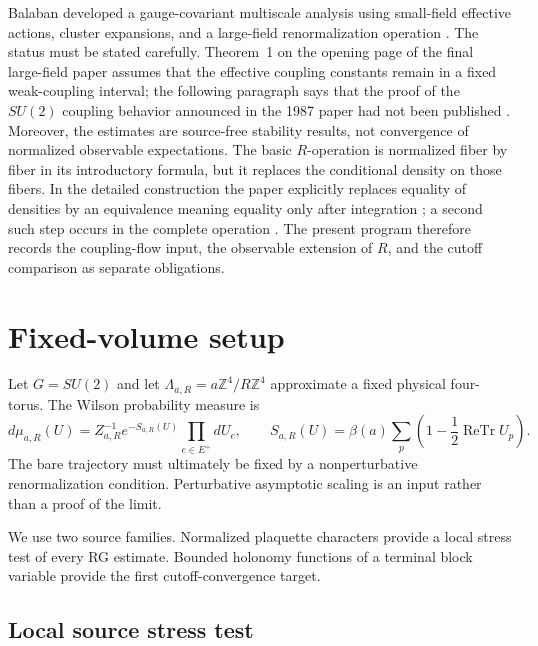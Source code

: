 \documentclass[11pt]{article}
\theoremstyle{definition}
\theoremstyle{remark}
\begin{document}
Balaban developed a gauge-covariant multiscale analysis using small-field
effective actions, cluster expansions, and a large-field renormalization
operation
\cite{Balaban1987RGI,Balaban1988RGII,Balaban1988Convergent,
Balaban1989LargeI,Balaban1989LargeII}.
The status must be stated carefully.  Theorem~1 on the opening page of the final
large-field paper assumes that the effective coupling constants remain in a
fixed weak-coupling interval; the following paragraph says that the proof of the
$SU(2)$ coupling behavior announced in the 1987 paper had not been published
\cite[p.~355]{Balaban1989LargeII}.  Moreover, the estimates are source-free
stability results, not convergence of normalized observable expectations.  The
basic $R$-operation is normalized fiber by fiber in its introductory formula,
but it replaces the conditional density on those fibers.  In the detailed
construction the paper explicitly replaces equality of densities by an
equivalence meaning equality only after integration
\cite[pp.~176, 193--194, 200--201]{Balaban1989LargeI}; a second such step occurs
in the complete operation \cite[p.~378]{Balaban1989LargeII}.
The present program therefore records the coupling-flow input, the observable
extension of $R$, and the cutoff comparison as separate obligations.

\section{Fixed-volume setup}

Let $G=SU(2)$ and let
$\Lambda_{a,R}=a\mathbb Z^4/R\mathbb Z^4$ approximate a fixed physical
four-torus.  The Wilson probability measure is
\[
 d\mu_{a,R}(U)=Z_{a,R}^{-1}e^{-S_{a,R}(U)}\prod_{e\in E^+}dU_e,
 \qquad
 S_{a,R}(U)=\beta(a)\sum_p
 \left(1-\frac12\operatorname{ReTr}U_p\right).
\]
The bare trajectory must ultimately be fixed by a nonperturbative
renormalization condition.  Perturbative asymptotic scaling is an input rather
than a proof of the limit.

We use two source families.  Normalized plaquette characters provide a local
stress test of every RG estimate.  Bounded holonomy functions of a terminal
block variable provide the first cutoff-convergence target.

\subsection{Local source stress test}
\end{document}
